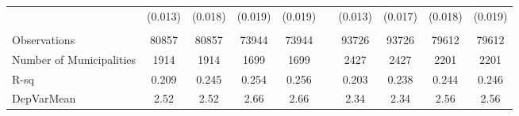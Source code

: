 \begin{tabular}{lccccccccc}
      & (0.013) & (0.018) & (0.019) & (0.019) &       & (0.013) & (0.017) & (0.018) & (0.019) \\
      &       &       &       &       &       &       &       &       &  \\
\midrule
Observations & 80857 & 80857 & 73944 & 73944 &       & 93726 & 93726 & 79612 & 79612 \\
Number of Municipalities & 1914  & 1914  & 1699  & 1699  &       & 2427  & 2427  & 2201  & 2201 \\
R-sq  & 0.209 & 0.245 & 0.254 & 0.256 &       & 0.203 & 0.238 & 0.244 & 0.246 \\
DepVarMean & 2.52  & 2.52  & 2.66  & 2.66  &       & 2.34  & 2.34  & 2.56  & 2.56 \\
\bottomrule
\bottomrule
\end{tabular}%

